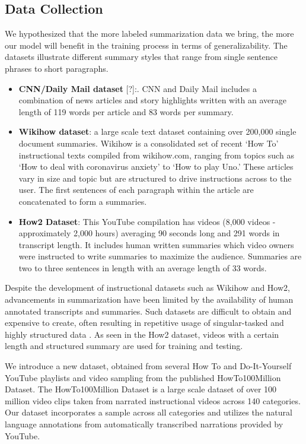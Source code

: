 \documentclass{article}
\begin{document}
\subsection{Data Collection}
We hypothesized that the more labeled summarization data we bring, the more our model will benefit in the training process in terms of generalizability. The datasets illustrate different summary styles that range from single sentence phrases to short paragraphs. 

\begin{itemize}

\item \textbf{CNN/Daily Mail dataset}  [?]:. CNN and Daily Mail includes a combination of news articles and story highlights written with an average length of 119 words per article and 83 words per summary.
\item \textbf{Wikihow dataset}: a large scale text dataset containing over 200,000 single document summaries. Wikihow is a consolidated set of recent ‘How To’ instructional texts compiled from wikihow.com, ranging from topics such as ‘How to deal with coronavirus anxiety’ to ‘How to play Uno.’ These articles vary in size and topic but are structured to drive instructions across to the user. The first sentences of each paragraph within the article are concatenated to form a summaries. 
\item \textbf{How2 Dataset}:  This YouTube compilation has videos (8,000 videos - approximately 2,000 hours) averaging 90 seconds long and 291 words in transcript length. It includes human written summaries which video owners were instructed to write summaries to maximize the audience. Summaries are two to three sentences in length with an average length of 33 words. 

\end{itemize}

Despite the development of instructional datasets such as Wikihow and How2, advancements in summarization have been limited by the availability of human annotated transcripts and summaries. Such datasets are difficult to obtain and expensive to create, often resulting in repetitive usage of singular-tasked and highly structured data . As seen in the How2 dataset, videos with a certain length and structured summary are used for training and testing. 

We introduce a new dataset, obtained from several How To and Do-It-Yourself YouTube playlists and video sampling from the published HowTo100Million Dataset. The HowTo100Million Dataset is a large scale dataset of over 100 million video clips taken from narrated instructional videos across 140 categories. Our dataset incorporates a sample across all categories and utilizes the natural language annotations from automatically transcribed narrations provided by YouTube.
\end{document}
